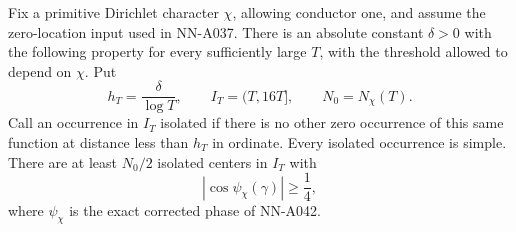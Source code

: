 \begin{lemma}
\label{lem:A045-isolated-phase}
Fix a primitive Dirichlet character \(\chi\), allowing
conductor one, and assume the zero-location input used in
NN-A037. There is an absolute constant \(\delta>0\) with the
following property for every sufficiently large \(T\), with
the threshold allowed to depend on \(\chi\).
Put
\[
 h_T=\frac{\delta}{\log T},\qquad
 I_T=(T,16T],\qquad N_0=N_\chi(T).
\]
Call an occurrence in \(I_T\) isolated if there is no other
zero occurrence of this same function at distance less than
\(h_T\) in ordinate. Every isolated occurrence is simple.
There are at least \(N_0/2\) isolated centers in \(I_T\) with
\[
                 |\cos\psi_\chi(\gamma)|\ge\frac14,
\]
where \(\psi_\chi\) is the exact corrected phase of NN-A042.
\end{lemma}


